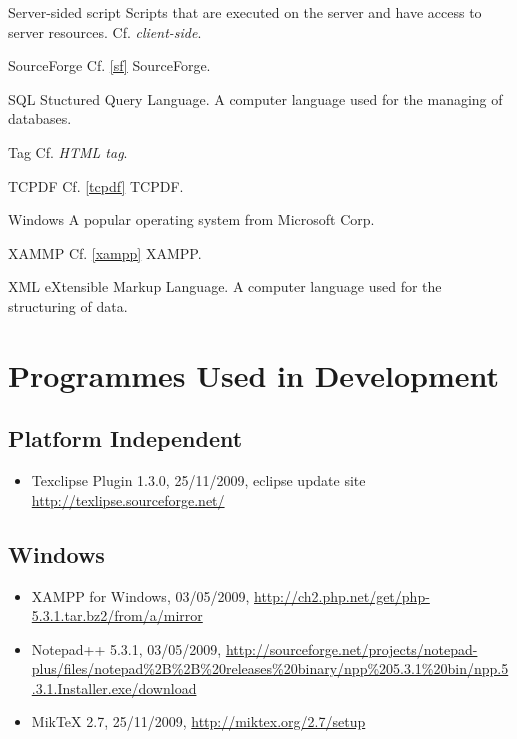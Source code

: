 \documentclass[12pt,a4paper,twoside,openany]{report}
\begin{document}
\begin{basedescript}{}
\item[Server-sided script] Scripts that are executed on the server and have
access to server resources. Cf. \textit{client-side}.

\item[SourceForge] Cf. \ref{sf} SourceForge.

\item[SQL] Stuctured Query Language. A computer language used for the managing
of databases.

\item[Tag] Cf. \textit{HTML tag}.

\item[TCPDF] Cf. \ref{tcpdf} TCPDF.

\item[Windows\texttrademark] A popular operating system from Microsoft Corp.

\item[XAMMP] Cf. \ref{xampp} XAMPP.

\item[XML] eXtensible Markup Language. A computer language used for the
structuring of data.

\end{basedescript}

\chapter{Programmes Used in Development}
\section{Platform Independent}
\begin{itemize}

\item Texclipse Plugin 1.3.0, 25/11/2009, eclipse update site
\url{http://texlipse.sourceforge.net/}

\end{itemize}

\section{Windows}
\begin{itemize}

\item XAMPP for Windows, 03/05/2009,
\url{http://ch2.php.net/get/php-5.3.1.tar.bz2/from/a/mirror}

\item Notepad++ 5.3.1, 03/05/2009,
\url{http://sourceforge.net/projects/notepad-plus/files/notepad%2B%2B%20releases%20binary/npp%205.3.1%20bin/npp.5.3.1.Installer.exe/download}

\item MikTeX 2.7, 25/11/2009, \url{http://miktex.org/2.7/setup}

\end{itemize}
\end{document}
